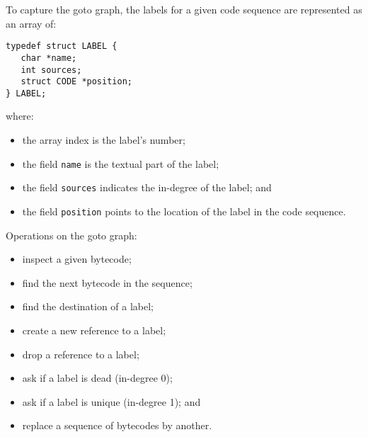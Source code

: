 \begin{slide*}
To capture the goto graph,
the labels for a given code sequence are represented as an array of:

\begin{small}
\begin{verbatim}
typedef struct LABEL {
   char *name;
   int sources;
   struct CODE *position;
} LABEL;
\end{verbatim}
\end{small}

where:

\begin{itemize}
\item the array index is the label's number;
\item the field {\tt name} is the textual part of the label;
\item the field {\tt sources} indicates the in-degree of the label; and
\item the field {\tt position} points to the location of the label in the code sequence.
\end{itemize}
\vfil
\end{slide*}
 
\begin{slide*}
Operations on the goto graph:
\begin{itemize}
\item inspect a given bytecode;
\item find the next bytecode in the sequence;
\item find the destination of a label;
\item create a new reference to a label;
\item drop a reference to a label;
\item ask if a label is dead (in-degree 0);
\item ask if a label is unique (in-degree 1); and
\item replace a sequence of bytecodes by another.
\end{itemize}
\vfil
\end{slide*}
 
